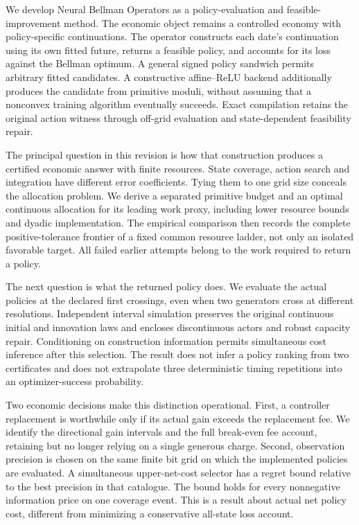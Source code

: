 \documentclass[ecta,nameyear,draft]{econsocart}
\begin{document}
We develop Neural Bellman Operators as a policy-evaluation and feasible-improvement method. The economic object remains a controlled economy with policy-specific continuations. The operator constructs each date's continuation using its own fitted future, returns a feasible policy, and accounts for its loss against the Bellman optimum. A general signed policy sandwich permits arbitrary fitted candidates. A constructive affine--ReLU backend additionally produces the candidate from primitive moduli, without assuming that a nonconvex training algorithm eventually succeeds. Exact compilation retains the original action witness through off-grid evaluation and state-dependent feasibility repair.

The principal question in this revision is how that construction produces a certified economic answer with finite resources. State coverage, action search and integration have different error coefficients. Tying them to one grid size conceals the allocation problem. We derive a separated primitive budget and an optimal continuous allocation for its leading work proxy, including lower resource bounds and dyadic implementation. The empirical comparison then records the complete positive-tolerance frontier of a fixed common resource ladder, not only an isolated favorable target. All failed earlier attempts belong to the work required to return a policy.

The next question is what the returned policy does. We evaluate the actual policies at the declared first crossings, even when two generators cross at different resolutions. Independent interval simulation preserves the original continuous initial and innovation laws and encloses discontinuous actors and robust capacity repair. Conditioning on construction information permits simultaneous cost inference after this selection. The result does not infer a policy ranking from two certificates and does not extrapolate three deterministic timing repetitions into an optimizer-success probability.

Two economic decisions make this distinction operational. First, a controller replacement is worthwhile only if its actual gain exceeds the replacement fee. We identify the directional gain intervals and the full break-even fee account, retaining but no longer relying on a single generous charge. Second, observation precision is chosen on the same finite bit grid on which the implemented policies are evaluated. A simultaneous upper-net-cost selector has a regret bound relative to the best precision in that catalogue. The bound holds for every nonnegative information price on one coverage event. This is a result about actual net policy cost, different from minimizing a conservative all-state loss account.
\end{document}

